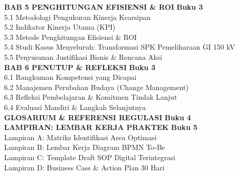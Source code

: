 \documentclass[12pt,a4paper]{report}
\begin{document}
{\large\bfseries BAB 5 \quad PENGHITUNGAN EFISIENSI \& ROI} \dotfill \textbf{Buku 3} \\
\hspace*{1.5cm} 5.1 Metodologi Pengukuran Kinerja Kearsipan \dotfill \\
\hspace*{1.5cm} 5.2 Indikator Kinerja Utama (KPI) \dotfill \\
\hspace*{1.5cm} 5.3 Metode Penghitungan Efisiensi \& ROI \dotfill \\
\hspace*{1.5cm} 5.4 Studi Kasus Menyeluruh: Transformasi SPK Pemeliharaan GI 150 kV \dotfill \\
\hspace*{1.5cm} 5.5 Penyusunan Justifikasi Bisnis \& Rencana Aksi \dotfill \\[0.2cm]

{\large\bfseries BAB 6 \quad PENUTUP \& REFLEKSI} \dotfill \textbf{Buku 3} \\
\hspace*{1.5cm} 6.1 Rangkuman Kompetensi yang Dicapai \dotfill \\
\hspace*{1.5cm} 6.2 Manajemen Perubahan Budaya (Change Management) \dotfill \\
\hspace*{1.5cm} 6.3 Refleksi Pembelajaran \& Komitmen Tindak Lanjut \dotfill \\
\hspace*{1.5cm} 6.4 Evaluasi Mandiri \& Langkah Selanjutnya \dotfill \\[0.4cm]

{\large\bfseries GLOSARIUM \& REFERENSI REGULASI} \dotfill \textbf{Buku 4} \\[0.4cm]

{\large\bfseries LAMPIRAN: LEMBAR KERJA PRAKTEK} \dotfill \textbf{Buku 5} \\
\hspace*{1.5cm} Lampiran A: Matriks Identifikasi Area Optimasi \dotfill \\
\hspace*{1.5cm} Lampiran B: Lembar Kerja Diagram BPMN To-Be \dotfill \\
\hspace*{1.5cm} Lampiran C: Template Draft SOP Digital Terintegrasi \dotfill \\
\hspace*{1.5cm} Lampiran D: Business Case \& Action Plan 30 Hari \dotfill
\newpage
\end{document}
